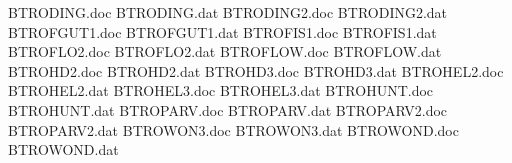 BTRODING.doc
BTRODING.dat
BTRODING2.doc
BTRODING2.dat
BTROFGUT1.doc
BTROFGUT1.dat
BTROFIS1.doc
BTROFIS1.dat
BTROFLO2.doc
BTROFLO2.dat
BTROFLOW.doc
BTROFLOW.dat
BTROHD2.doc
BTROHD2.dat
BTROHD3.doc
BTROHD3.dat
BTROHEL2.doc
BTROHEL2.dat
BTROHEL3.doc
BTROHEL3.dat
BTROHUNT.doc
BTROHUNT.dat
BTROPARV.doc
BTROPARV.dat
BTROPARV2.doc
BTROPARV2.dat
BTROWON3.doc
BTROWON3.dat
BTROWOND.doc
BTROWOND.dat

